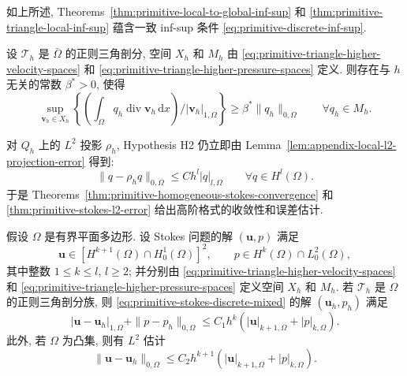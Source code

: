 如上所述, Theorems~\ref{thm:primitive-local-to-global-inf-sup} 和
\ref{thm:primitive-triangle-local-inf-sup} 蕴含一致 inf-sup 条件
\eqref{eq:primitive-discrete-inf-sup}.

\setcounter{statement}{5}
\begin{Lemma}\label{lem:primitive-triangle-global-inf-sup}
设 $\mathcal{T}_h$ 是 $\bar\Omega$ 的正则三角剖分,
空间 $X_h$ 和 $M_h$ 由
\eqref{eq:primitive-triangle-higher-velocity-spaces} 和
\eqref{eq:primitive-triangle-higher-pressure-spaces} 定义.
则存在与 $h$ 无关的常数 $\beta^*>0$, 使得
\[
\sup_{\mathbf v_h\in X_h}
\left\{
\left(\int_\Omega q_h\operatorname{div}\mathbf v_h\,\mathrm dx\right)
/|\mathbf v_h|_{1,\Omega}
\right\}
\geq\beta^*\|q_h\|_{0,\Omega}
\qquad\forall q_h\in M_h.
\]
\end{Lemma}

对 $Q_h$ 上的 $L^2$ 投影 $\rho_h$, Hypothesis H2 仍立即由
Lemma~\ref{lem:appendix-local-l2-projection-error} 得到:
\begin{equation}\label{eq:primitive-triangle-higher-pressure-projection}
\|q-\rho_hq\|_{0,\Omega}
\leq Ch^l|q|_{l,\Omega}
\qquad\forall q\in H^l(\Omega).
\end{equation}
于是 Theorems~\ref{thm:primitive-homogeneous-stokes-convergence} 和
\ref{thm:primitive-stokes-l2-error} 给出高阶格式的收敛性和误差估计.

\setcounter{statement}{2}
\begin{Theorem}\label{thm:primitive-triangle-higher-convergence}
假设 $\Omega$ 是有界平面多边形. 设 Stokes 问题的解
$(\mathbf u,p)$ 满足
\[
\mathbf u\in[H^{k+1}(\Omega)\cap H_0^1(\Omega)]^2,
\qquad p\in H^k(\Omega)\cap L_0^2(\Omega),
\]
其中整数 $1\leq k\leq l$, $l\geq2$; 并分别由
\eqref{eq:primitive-triangle-higher-velocity-spaces} 和
\eqref{eq:primitive-triangle-higher-pressure-spaces} 定义空间 $X_h$ 和
$M_h$. 若 $\mathcal{T}_h$ 是 $\Omega$ 的正则三角剖分族,
则 \eqref{eq:primitive-stokes-discrete-mixed} 的解
$(\mathbf u_h,p_h)$ 满足
\begin{equation}\label{eq:primitive-triangle-higher-h1-error}
|\mathbf u-\mathbf u_h|_{1,\Omega}
+\|p-p_h\|_{0,\Omega}
\leq C_1h^k(|\mathbf u|_{k+1,\Omega}+|p|_{k,\Omega}).
\end{equation}
此外, 若 $\Omega$ 为凸集, 则有 $L^2$ 估计
\begin{equation}\label{eq:primitive-triangle-higher-l2-error}
\|\mathbf u-\mathbf u_h\|_{0,\Omega}
\leq C_2h^{k+1}(|\mathbf u|_{k+1,\Omega}+|p|_{k,\Omega}).
\end{equation}
\end{Theorem}

